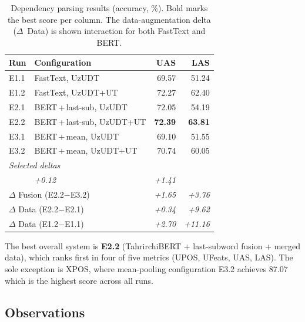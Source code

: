 \documentclass[runningheads]{llncs}
\begin{document}
\begin{table}[t]
\centering
\small
\begin{tabular*}{\textwidth}{@{\extracolsep{\fill}}llrr@{}}
\toprule
\textbf{Run} & \textbf{Configuration} & \textbf{UAS} & \textbf{LAS} \\
\midrule
E1.1 & FastText, UzUDT               & 69.57 & 51.24 \\
E1.2 & FastText, UzUDT+UT            & 72.27 & 62.40 \\
\addlinespace
E2.1 & BERT\,+\,last-sub, UzUDT      & 72.05 & 54.19 \\
E2.2 & BERT\,+\,last-sub, UzUDT+UT   & \textbf{72.39} & \textbf{63.81} \\
\addlinespace
E3.1 & BERT\,+\,mean, UzUDT           & 69.10 & 51.55 \\
E3.2 & BERT\,+\,mean, UzUDT+UT        & 70.74 & 60.05 \\
\midrule
\multicolumn{4}{l}{\textit{Selected deltas}} \\
\addlinespace
\multicolumn{2}{l}{$\Delta$ Embedding (E2.2$-$E1.2)}
      & \emph{+0.12} & \emph{+1.41} \\
\multicolumn{2}{l}{$\Delta$ Fusion (E2.2$-$E3.2)}
      & \emph{+1.65} & \emph{+3.76} \\
\multicolumn{2}{l}{$\Delta$ Data (E2.2$-$E2.1)}
      & \emph{+0.34} & \emph{+9.62} \\
\multicolumn{2}{l}{$\Delta$ Data (E1.2$-$E1.1)}
      & \emph{+2.70} & \emph{+11.16} \\
\bottomrule
\end{tabular*}
\caption{Dependency parsing results (accuracy, \%).
Bold marks the best score per column.
The data-augmentation delta ($\Delta$~Data) is shown interaction for both FastText and BERT.}
\label{tab:parsing_results}
\end{table}

The best overall system is \textbf{E2.2} (TahrirchiBERT + last-subword fusion + merged data), which ranks first in four of five metrics (UPOS, UFeats, UAS, LAS).
The sole exception is XPOS, where mean-pooling configuration E3.2 achieves 87.07 which is the highest score across all runs.

\subsection{Observations}
\label{sec:observations}
\end{document}
